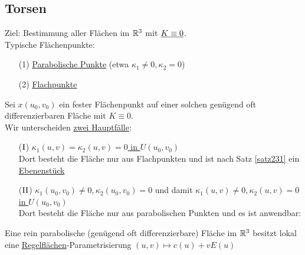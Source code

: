 \subsection{Torsen}
Ziel: Bestimmung aller Flächen im \(\mathbb{R}^3\) mit \(\uline{K \equiv 0}\). \\
Typische Flächenpunkte:
\begin{enumerate}
 \item[(1)] \uline{Parabolische Punkte} (etwa \(\kappa_1 \ne 0, \kappa_2 = 0\))
 \item[(2)] \uline{Flachpunkte}
\end{enumerate}

Sei \(x(u_0, v_0)\) ein fester Flächenpunkt auf einer solchen genügend oft differenzierbaren Fläche mit \(K \equiv 0\). \\
Wir unterscheiden \uline{zwei Hauptfälle}:
\begin{enumerate}
 \item[{\color{green}(\(\Rom1\))}] \uline{\(\kappa_1(u,v) = \kappa_2(u,v) = 0\) in \(U(u_0, v_0)\)} \\
 Dort besteht die Fläche nur aus Flachpunkten und ist nach Satz \ref{satz231} ein \uline{Ebenenstück}
 \item[{\color{green}(\(\Rom2\))}] \(\kappa_1(u_0, v_0) \ne 0, \kappa_2(u_0, v_0) = 0\) und damit \uline{\(\kappa_1(u,v) \ne 0, \kappa_2(u,v) = 0\) in \(U(u_0, v_0)\)} \\
 Dort besteht die Fläche nur aus parabolischen Punkten und es ist anwendbar:
\end{enumerate}

\begin{satz}\label{satz262}
 Eine rein parabolische (genügend oft differenzierbare) Fläche im \(\mathbb{R}^3\) besitzt lokal eine \uline{Regelflächen}-Parametrisierung \((u,v) \mapsto c(u) + v E(u)\)
\end{satz}

